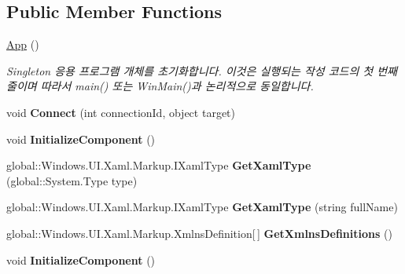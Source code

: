 \subsection*{Public Member Functions}
\begin{DoxyCompactItemize}
\item 
\hyperlink{class_cloud_bread_windows_store_app_test_tool_1_1_app_a1719bb741c5cfb24b6745cd2b9172bd8}{App} ()
\begin{DoxyCompactList}\small\item\em Singleton 응용 프로그램 개체를 초기화합니다. 이것은 실행되는 작성 코드의 첫 번째 줄이며 따라서 main() 또는 Win\+Main()과 논리적으로 동일합니다. \end{DoxyCompactList}\item 
void {\bfseries Connect} (int connection\+Id, object target)\hypertarget{class_cloud_bread_windows_store_app_test_tool_1_1_app_aa0b90b9ef72df1b4b04b989765843170}{}\label{class_cloud_bread_windows_store_app_test_tool_1_1_app_aa0b90b9ef72df1b4b04b989765843170}

\item 
void {\bfseries Initialize\+Component} ()\hypertarget{class_cloud_bread_windows_store_app_test_tool_1_1_app_a8956af89a6c67e881e14444a106aa2a0}{}\label{class_cloud_bread_windows_store_app_test_tool_1_1_app_a8956af89a6c67e881e14444a106aa2a0}

\item 
global\+::\+Windows.\+U\+I.\+Xaml.\+Markup.\+I\+Xaml\+Type {\bfseries Get\+Xaml\+Type} (global\+::\+System.\+Type type)\hypertarget{class_cloud_bread_windows_store_app_test_tool_1_1_app_ab857c47c2dd1871550b33aa1db3065d7}{}\label{class_cloud_bread_windows_store_app_test_tool_1_1_app_ab857c47c2dd1871550b33aa1db3065d7}

\item 
global\+::\+Windows.\+U\+I.\+Xaml.\+Markup.\+I\+Xaml\+Type {\bfseries Get\+Xaml\+Type} (string full\+Name)\hypertarget{class_cloud_bread_windows_store_app_test_tool_1_1_app_a8bec7c4a0cd7ae2cfcfd21d87b96d308}{}\label{class_cloud_bread_windows_store_app_test_tool_1_1_app_a8bec7c4a0cd7ae2cfcfd21d87b96d308}

\item 
global\+::\+Windows.\+U\+I.\+Xaml.\+Markup.\+Xmlns\+Definition\mbox{[}$\,$\mbox{]} {\bfseries Get\+Xmlns\+Definitions} ()\hypertarget{class_cloud_bread_windows_store_app_test_tool_1_1_app_aec8eef3d490b093f325f842569bee9c5}{}\label{class_cloud_bread_windows_store_app_test_tool_1_1_app_aec8eef3d490b093f325f842569bee9c5}

\item 
void {\bfseries Initialize\+Component} ()\hypertarget{class_cloud_bread_windows_store_app_test_tool_1_1_app_a8956af89a6c67e881e14444a106aa2a0}{}\label{class_cloud_bread_windows_store_app_test_tool_1_1_app_a8956af89a6c67e881e14444a106aa2a0}

\end{DoxyCompactItemize}
